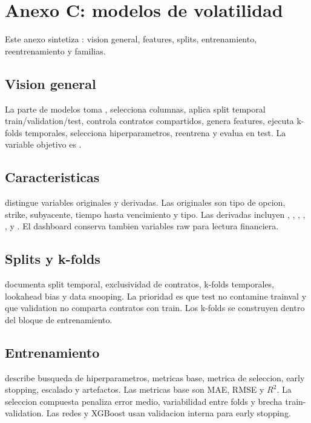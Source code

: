 \chapter{Anexo C: modelos de volatilidad}

Este anexo sintetiza : vision general, features, splits, entrenamiento, reentrenamiento y familias.

\section{Vision general}

La parte de modelos toma , selecciona columnas, aplica split temporal train/validation/test, controla contratos compartidos, genera features, ejecuta k-folds temporales, selecciona hiperparametros, reentrena y evalua en test. La variable objetivo es .

\section{Caracteristicas}

 distingue variables originales y derivadas. Las originales son tipo de opcion, strike, subyacente, tiempo hasta vencimiento y tipo. Las derivadas incluyen , , , , ,  y . El dashboard conserva tambien variables raw para lectura financiera.

\section{Splits y k-folds}

 documenta split temporal, exclusividad de contratos, k-folds temporales, lookahead bias y data snooping. La prioridad es que test no contamine trainval y que validation no comparta contratos con train. Los k-folds se construyen dentro del bloque de entrenamiento.

\section{Entrenamiento}

 describe busqueda de hiperparametros, metricas base, metrica de seleccion, early stopping, escalado y artefactos. Las metricas base son MAE, RMSE y $R^2$. La seleccion compuesta penaliza error medio, variabilidad entre folds y brecha train-validation. Las redes y XGBoost usan validacion interna para early stopping.

